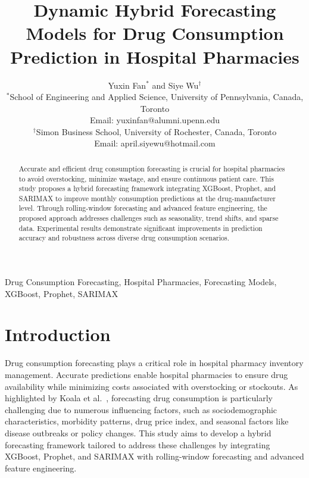 \documentclass[journal]{IEEEtran}
\begin{document}
\title{Dynamic Hybrid Forecasting Models for Drug Consumption Prediction in Hospital Pharmacies}

\author{Yuxin Fan$^{*}$ and Siye Wu$^{\dagger}$ \\
$^{*}$School of Engineering and Applied Science, University of Pennsylvania, Canada, Toronto \\
Email: yuxinfan@alumni.upenn.edu \\
$^{\dagger}$Simon Business School, University of Rochester, Canada, Toronto \\
Email: april.siyewu@hotmail.com}

\maketitle

\begin{abstract}
Accurate and efficient drug consumption forecasting is crucial for hospital pharmacies to avoid overstocking, minimize wastage, and ensure continuous patient care. This study proposes a hybrid forecasting framework integrating XGBoost, Prophet, and SARIMAX to improve monthly consumption predictions at the drug-manufacturer level. Through rolling-window forecasting and advanced feature engineering, the proposed approach addresses challenges such as seasonality, trend shifts, and sparse data. Experimental results demonstrate significant improvements in prediction accuracy and robustness across diverse drug consumption scenarios.
\end{abstract}

\begin{IEEEkeywords}
Drug Consumption Forecasting, Hospital Pharmacies, Forecasting Models, XGBoost, Prophet, SARIMAX
\end{IEEEkeywords}

\section{Introduction}

Drug consumption forecasting plays a critical role in hospital pharmacy inventory management. Accurate predictions enable hospital pharmacies to ensure drug availability while minimizing costs associated with overstocking or stockouts. As highlighted by Koala et al.~\cite{koala2021factors}, forecasting drug consumption is particularly challenging due to numerous influencing factors, such as sociodemographic characteristics, morbidity patterns, drug price index, and seasonal factors like disease outbreaks or policy changes. This study aims to develop a hybrid forecasting framework tailored to address these challenges by integrating XGBoost, Prophet, and SARIMAX with rolling-window forecasting and advanced feature engineering.  
\end{document}
